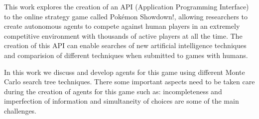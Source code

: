\begin{resumoingles}
This work explores the creation of an API (Application Programming Interface) to the online strategy game called Pok\'{e}mon Showdown!, allowing researchers to create autonomous agents to compete against human players in an extremely competitive environment with thousands of active players at all the time. The creation of this API can enable searches of new artificial intelligence techniques and comparision of different techniques when submitted to games with humans.

In this work we discuss and develop agents for this game using different Monte Carlo search tree techniques. There some important aspects need to be taken care during the creation of agents for this game such as: incompleteness and imperfection of information and simultaneity of choices are some of the main challenges.
\end{resumoingles}